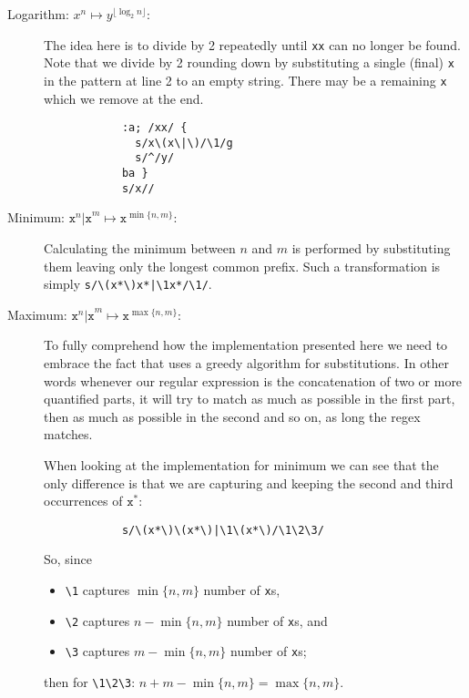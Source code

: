 \begin{description}
	\item[Logarithm: $x^n\mapsto y^{\lfloor\log_2 n\rfloor}$:]

		The idea here is to divide by 2 repeatedly until {\tt xx} can no longer
		be found.  Note that we divide by 2 rounding down by substituting a
		single (final) {\tt x} in the pattern at line 2 to an empty string.
		There may be a remaining {\tt x} which we remove at the end.

		\begin{Verbatim}
			:a; /xx/ {
			  s/x\(x\|\)/\1/g
			  s/^/y/
			ba }
			s/x//
		\end{Verbatim}

	\item[Minimum: $\texttt{x}^n\texttt{|x}^m \mapsto
		\texttt{x}^{\min\{n,m\}}$:]

		Calculating the minimum between $n$ and $m$ is performed by
		substituting them leaving only the longest common prefix.  Such a
		transformation is simply \verb!s/\(x*\)x*|\1x*/\1/!.

	\item[Maximum: $\texttt{x}^n\texttt{|x}^m \mapsto
		\texttt{x}^{\max\{n,m\}}$:]

		To fully comprehend how the implementation presented here
		we need to embrace the fact that \sed* uses a greedy algorithm for
		substitutions. In other words whenever our regular
		expression is the concatenation of two or more quantified parts, it
		will try to match as much as possible in the first part, then as
		much as possible in the second and so on, as long the regex matches.

		When looking at the implementation for minimum we can see that the
		only difference is that we are capturing and keeping the second and
		third occurrences of $\texttt{x}^*$:

		\begin{Verbatim}
			s/\(x*\)\(x*\)|\1\(x*\)/\1\2\3/
		\end{Verbatim}

		So, since
		\begin{itemize}
			\item \verb|\1| captures $\min\{n,m\}$ number of \verb|x|s,
			\item \verb|\2| captures $n-\min\{n,m\}$ number of \verb|x|s, and
			\item \verb|\3| captures $m-\min\{n,m\}$ number of \verb|x|s;
		\end{itemize}
		then for \verb|\1\2\3|: $n+m-\min\{n,m\}=\max\{n,m\}$.


\end{description}
